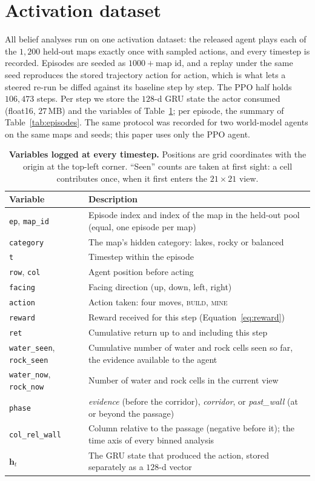 \section{Activation dataset}
\label{app:dataset}
All belief analyses run on one activation dataset: the released agent plays
each of the $1{,}200$ held-out maps exactly once with sampled actions, and
every timestep is recorded. Episodes are seeded as $1000 + \text{map id}$, and
a replay under the same seed reproduces the stored trajectory action for action,
which is what lets a steered re-run be diffed against its baseline step by
step. The PPO half holds $106{,}473$ steps. Per step we store the $128$-d GRU
state the actor consumed (float16, $27$\,MB) and the variables of
Table~\ref{tab:steps}; per episode, the summary of Table~\ref{tab:episodes}.
The same protocol was recorded for two world-model agents on the same maps and
seeds; this paper uses only the PPO agent.

\begin{table}[h]
\centering
\small
\caption{\textbf{Variables logged at every timestep.} Positions are grid
coordinates with the origin at the top-left corner. ``Seen'' counts are taken
at first sight: a cell contributes once, when it first enters the $21\times21$
view.}
\label{tab:steps}
\begin{tabular}{@{}lp{9.6cm}@{}}
\toprule
Variable & Description \\
\midrule
\texttt{ep}, \texttt{map\_id} & Episode index and index of the map in the held-out pool (equal, one episode per map) \\
\texttt{category} & The map's hidden category: lakes, rocky or balanced \\
\texttt{t} & Timestep within the episode \\
\texttt{row}, \texttt{col} & Agent position before acting \\
\texttt{facing} & Facing direction (up, down, left, right) \\
\texttt{action} & Action taken: four moves, \textsc{build}, \textsc{mine} \\
\texttt{reward} & Reward received for this step (Equation~\ref{eq:reward}) \\
\texttt{ret} & Cumulative return up to and including this step \\
\texttt{water\_seen}, \texttt{rock\_seen} & Cumulative number of water and rock cells seen so far, the evidence available to the agent \\
\texttt{water\_now}, \texttt{rock\_now} & Number of water and rock cells in the current view \\
\texttt{phase} & \emph{evidence} (before the corridor), \emph{corridor}, or \emph{past\_wall} (at or beyond the passage) \\
\texttt{col\_rel\_wall} & Column relative to the passage (negative before it); the time axis of every binned analysis \\
$\mathbf{h}_t$ & The GRU state that produced the action, stored separately as a $128$-d vector \\
\bottomrule
\end{tabular}
\end{table}

